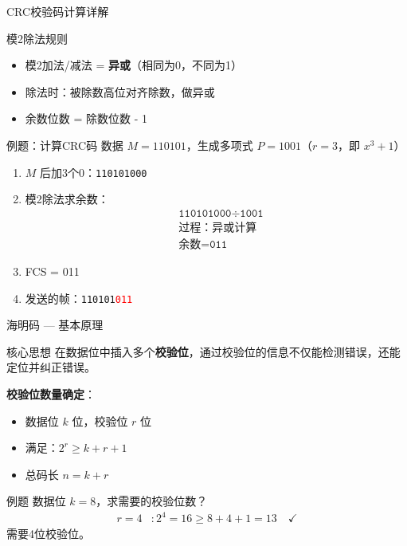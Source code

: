 \documentclass[10pt, aspectratio=169]{beamer}
\begin{document}
\begin{frame}{CRC校验码计算详解}
    \begin{block}{模2除法规则}
        \begin{itemize}
            \item 模2加法/减法 = \textbf{异或}（相同为0，不同为1）
            \item 除法时：被除数高位对齐除数，做异或
            \item 余数位数 = 除数位数 - 1
        \end{itemize}
    \end{block}
    \vspace{0.3em}
    \begin{exampleblock}{例题：计算CRC码}
        数据 $M = 110101$，生成多项式 $P = 1001$（$r=3$，即 $x^3+1$）
        \begin{enumerate}
            \item $M$ 后加3个0：\texttt{110101000}
            \item 模2除法求余数：
            \begin{align*}
                &\texttt{110101000} \div \texttt{1001} \\
                &\text{过程：异或计算} \\
                &\text{余数} = \texttt{011}
            \end{align*}
            \item FCS = 011
            \item 发送的帧：\texttt{110101\textcolor{red}{011}}
        \end{enumerate}
    \end{exampleblock}
\end{frame}

\begin{frame}{海明码 --- 基本原理}
    \begin{block}{核心思想}
        在数据位中插入多个\textbf{校验位}，通过校验位的信息不仅能检测错误，还能定位并纠正错误。
    \end{block}
    \vspace{0.3em}
    \textbf{校验位数量确定}：
    \begin{itemize}
        \item 数据位 $k$ 位，校验位 $r$ 位
        \item 满足：\textbf{$2^r \ge k + r + 1$}
        \item 总码长 $n = k + r$
    \end{itemize}
    \vspace{0.5em}
    \begin{exampleblock}{例题}
        数据位 $k=8$，求需要的校验位数？\\
        \begin{align*}
            r=4 &: 2^4 = 16 \ge 8+4+1 = 13 \quad \checkmark
        \end{align*}
        需要4位校验位。
    \end{exampleblock}
\end{frame}
\end{document}
